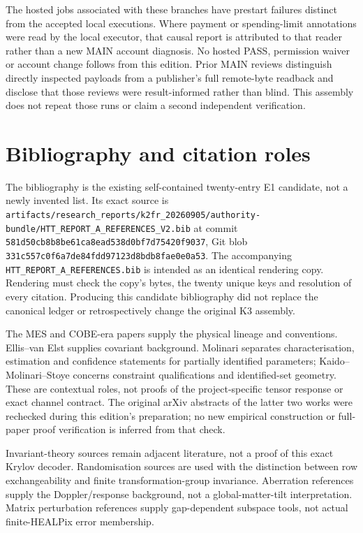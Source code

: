 \documentclass[
  11pt,
  a4paper]{article}
\begin{document}
The hosted jobs associated with these branches have prestart failures distinct from the accepted local executions. Where payment or spending-limit annotations were read by the local executor, that causal report is attributed to that reader rather than a new MAIN account diagnosis. No hosted PASS, permission waiver or account change follows from this edition. Prior MAIN reviews distinguish directly inspected payloads from a publisher's full remote-byte readback and disclose that those reviews were result-informed rather than blind. This assembly does not repeat those runs or claim a second independent verification.

\hypertarget{appendix-c.-bibliography-and-citation-roles}{%
\section{Bibliography and citation roles}\label{appendix-c.-bibliography-and-citation-roles}}

The bibliography is the existing self-contained twenty-entry E1 candidate, not a newly invented list. Its exact source is {\ttfamily\nolinkurl{artifacts/research_reports/k2fr_20260905/authority-bundle/HTT_REPORT_A_REFERENCES_V2.bib}} at commit {\ttfamily\nolinkurl{581d50cb8b8be61ca8ead538d0bf7d75420f9037}}, Git blob {\ttfamily\nolinkurl{331c557c0f6a7de84fdd97123d8bdb8fae0e0a53}}. The accompanying {\ttfamily\nolinkurl{HTT_REPORT_A_REFERENCES.bib}} is intended as an identical rendering copy. Rendering must check the copy's bytes, the twenty unique keys and resolution of every citation. Producing this candidate bibliography did not replace the canonical ledger or retrospectively change the original K3 assembly.

The MES and COBE-era papers supply the physical lineage and conventions. Ellis--van Elst supplies covariant background. Molinari separates characterisation, estimation and confidence statements for partially identified parameters; Kaido--Molinari--Stoye concerns constraint qualifications and identified-set geometry. These are contextual roles, not proofs of the project-specific tensor response or exact channel contract. The original arXiv abstracts of the latter two works were rechecked during this edition's preparation; no new empirical construction or full-paper proof verification is inferred from that check.

Invariant-theory sources remain adjacent literature, not a proof of this exact Krylov decoder. Randomisation sources are used with the distinction between row exchangeability and finite transformation-group invariance. Aberration references supply the Doppler/response background, not a global-matter-tilt interpretation. Matrix perturbation references supply gap-dependent subspace tools, not actual finite-HEALPix error membership.
\end{document}
